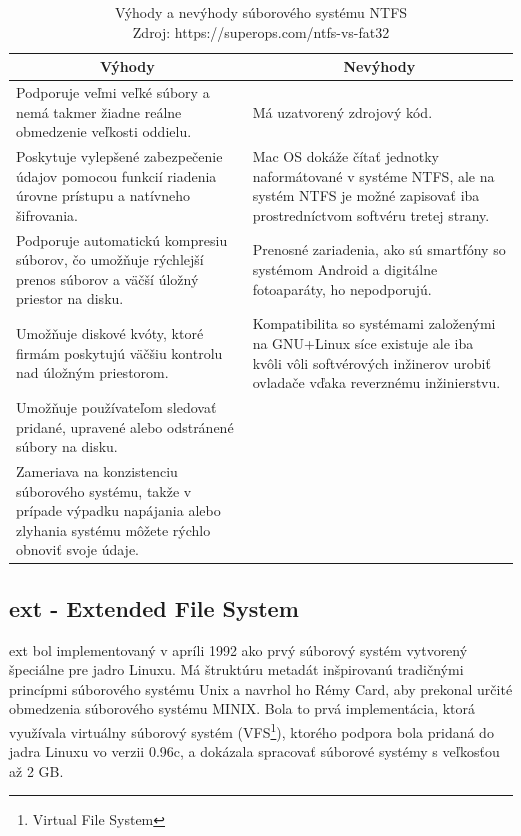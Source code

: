 \documentclass[12pt,oneside,slovak,a4paper]{article}
\begin{document}
\begin{table}[H]
\begin{tabularx}{\linewidth}{|X|X|}
\hline
\multicolumn{1}{|c|}{\textbf{Výhody}} & \multicolumn{1}{c|}{\textbf{Nevýhody}} \\ \hline
Podporuje veľmi veľké súbory a nemá takmer žiadne reálne obmedzenie veľkosti oddielu. & Má uzatvorený zdrojový kód. \\ \hline
Poskytuje vylepšené zabezpečenie údajov pomocou funkcií riadenia úrovne prístupu a natívneho šifrovania. & Mac OS dokáže čítať jednotky naformátované v systéme NTFS, ale na systém NTFS je možné zapisovať iba prostredníctvom softvéru tretej strany. \\ \hline
Podporuje automatickú kompresiu súborov, čo umožňuje rýchlejší prenos súborov a väčší úložný priestor na disku. & Prenosné zariadenia, ako sú smartfóny so systémom Android a digitálne fotoaparáty, ho nepodporujú. \\ \hline
Umožňuje diskové kvóty, ktoré firmám poskytujú väčšiu kontrolu nad úložným priestorom. & Kompatibilita so systémami založenými na GNU+Linux síce existuje ale iba kvôli vôli softvérových inžinerov urobiť ovladače vďaka reverznému inžinierstvu. \\ \hline
Umožňuje používateľom sledovať pridané, upravené alebo odstránené súbory na disku. &  \\ \hline
Zameriava na konzistenciu súborového systému, takže v prípade výpadku napájania alebo zlyhania systému môžete rýchlo obnoviť svoje údaje. &  \\ \hline
\end{tabularx}
\centering
\captionsetup{justification=centering,margin=2cm}
\caption{Výhody a nevýhody súborového systému NTFS \\ Zdroj: https://superops.com/ntfs-vs-fat32}
\end{table}

\subsection{ext - Extended File System}
ext bol implementovaný v apríli 1992 ako prvý súborový systém vytvorený špeciálne pre jadro Linuxu. Má štruktúru metadát inšpirovanú tradičnými princípmi súborového systému Unix a navrhol ho Rémy Card, aby prekonal určité obmedzenia súborového systému MINIX. Bola to prvá implementácia, ktorá využívala virtuálny súborový systém (VFS\footnote{Virtual File System}), ktorého podpora bola pridaná do jadra Linuxu vo verzii 0.96c, a dokázala spracovať súborové systémy s veľkosťou až 2 GB.
\end{document}
